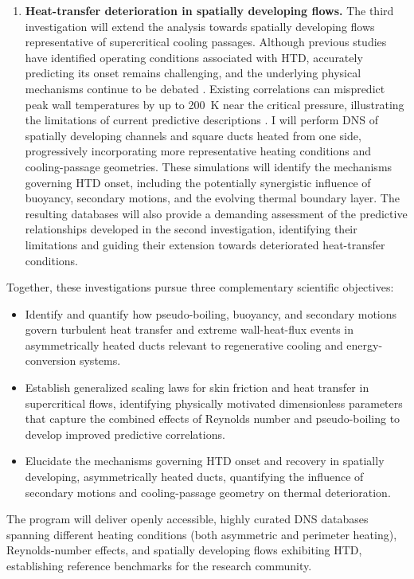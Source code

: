 \documentclass[11pt]{article}
\begin{document}
\begin{enumerate}
	\item \textbf{Heat-transfer deterioration in spatially developing flows.}
	The third investigation will extend the analysis towards spatially developing flows representative of supercritical cooling passages.
	Although previous studies have identified operating conditions associated with HTD, accurately predicting its onset remains challenging, and the underlying physical mechanisms continue to be debated \cite{Nasuti2021,Li2025}.
	Existing correlations can mispredict peak wall temperatures by up to 200~K near the critical pressure, illustrating the limitations of current predictive descriptions \cite{Nasuti2021}.
	I will perform DNS of spatially developing channels and square ducts heated from one side, progressively incorporating more representative heating conditions and cooling-passage geometries.
	These simulations will identify the mechanisms governing HTD onset, including the potentially synergistic influence of buoyancy, secondary motions, and the evolving thermal boundary layer.
	The resulting databases will also provide a demanding assessment of the predictive relationships developed in the second investigation, identifying their limitations and guiding their extension towards deteriorated heat-transfer conditions.
\end{enumerate}
Together, these investigations pursue three complementary scientific objectives:
\begin{itemize}
	\item[\textbf{O1.}] Identify and quantify how pseudo-boiling, buoyancy, and secondary motions govern turbulent heat transfer and extreme wall-heat-flux events in asymmetrically heated ducts relevant to regenerative cooling and energy-conversion systems.
	
	\item[\textbf{O2.}] Establish generalized scaling laws for skin friction and heat transfer in supercritical flows, identifying physically motivated dimensionless parameters that capture the combined effects of Reynolds number and pseudo-boiling to develop improved predictive correlations.
	
	\item[\textbf{O3.}] Elucidate the mechanisms governing HTD onset and recovery in spatially developing, asymmetrically heated ducts, quantifying the influence of secondary motions and cooling-passage geometry on thermal deterioration.
\end{itemize}
The program will deliver openly accessible, highly curated DNS databases spanning different heating conditions (both asymmetric and perimeter heating), Reynolds-number effects, and spatially developing flows exhibiting HTD, establishing reference benchmarks for the research community.
\end{document}
